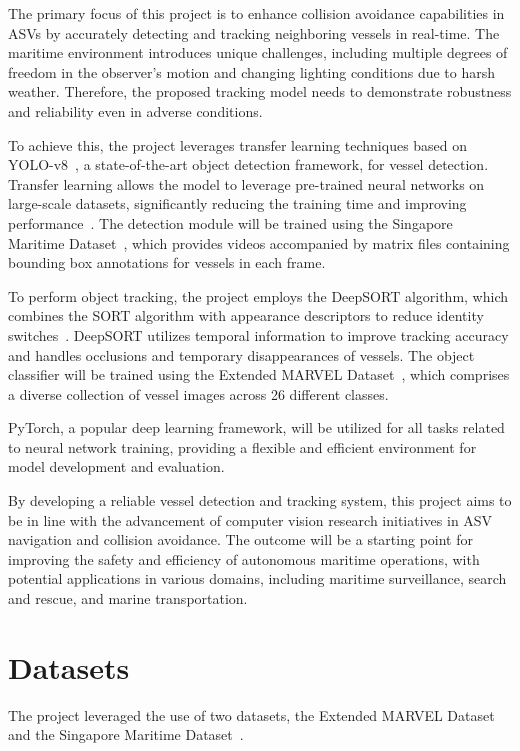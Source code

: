 \documentclass[a4paper,12pt]{article}
\begin{document}
\begin{multicols}{2}
The primary focus of this project is to enhance collision avoidance capabilities in ASVs by accurately detecting and tracking neighboring vessels in real-time.
The maritime environment introduces unique challenges, including multiple degrees of freedom in the observer's motion and changing lighting conditions due to harsh weather.
Therefore, the proposed tracking model needs to demonstrate robustness and reliability even in adverse conditions.

To achieve this, the project leverages transfer learning techniques based on YOLO-v8~\cite{YOLOV8}, a state-of-the-art object detection framework, for vessel detection.
Transfer learning allows the model to leverage pre-trained neural networks on large-scale datasets, significantly reducing the training time and improving performance~\cite{TRANSFERLEARNING}.
The detection module will be trained using the Singapore Maritime Dataset~\cite{SINGAPORE}, which provides videos accompanied by matrix files containing bounding box annotations for vessels in each frame.

To perform object tracking, the project employs the DeepSORT algorithm, which combines the SORT algorithm with appearance descriptors to reduce identity switches~\cite{DEEPSORT}.
DeepSORT utilizes temporal information to improve tracking accuracy and handles occlusions and temporary disappearances of vessels.
The object classifier will be trained using the Extended MARVEL Dataset~\cite{MARVEL}, which comprises a diverse collection of vessel images across 26 different classes.

PyTorch, a popular deep learning framework, will be utilized for all tasks related to neural network training, providing a flexible and efficient environment for model development and evaluation.

By developing a reliable vessel detection and tracking system, this project aims to be in line with the advancement of computer vision research initiatives in ASV navigation and collision avoidance.
The outcome will be a starting point for improving the safety and efficiency of autonomous maritime operations, with potential applications in various domains, including maritime surveillance, search and rescue, and marine transportation.

\section{Datasets}\label{sec:datasets}
The project leveraged the use of two datasets, the Extended MARVEL Dataset~\cite{MARVEL} and the Singapore Maritime Dataset~\cite{SINGAPORE}.


\end{multicols}
\end{document}
